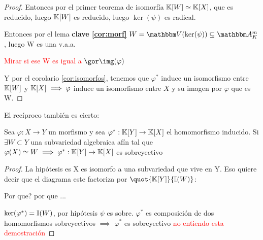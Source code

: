 \begin{proof}

Entonces por el primer teorema de isomorfía
$\mathbb{K}[W] \simeq \mathbb{K}[X]$, que es reducido, luego $\mathbb{K}[W]$ es reducido, luego $\ker(\psi)$ es radical.

Entonces por el lema \textbf{clave \ref{cor:morf}} $W=\V(\ker(\psi)) \subseteq \A_K^m$, luego W es una v.a.a.

\textcolor{red}{Mirar si ese W es igual a $\cls{\img(\varphi)}$}

Y por el corolario \ref{cor:isomorfos}, tenemos que $\varphi^*$ induce un isomorfismo entre $\mathbb{K}[W]$ y $\mathbb{K}[X] \implies \varphi$ induce un isomorfismo entre $X$ y su imagen por $\varphi$ que es W.

\end{proof}

El recíproco también es cierto:


\begin{lemma}
	Sea $\varphi: X \rightarrow Y$ un morfismo y sea $\varphi^*: \mathbb{K}[Y]\rightarrow \mathbb{K}[X]$ el homomorfismo inducido. Si $\exists W \subset Y$ una subvariedad algebraica afín tal que $\varphi(X) \simeq W \implies \varphi^*:\mathbb{K}[Y] \rightarrow \mathbb{K}[X]$ es sobreyectivo
\end{lemma}

\begin{proof}
	La hipótesis es X es isomorfo a una subvariedad que vive en Y. Eso quiere decir que el diagrama este factoriza por $\quot{\K[Y]}{\I(W)}$:


	Por que? por que ...

	$\ker(\varphi^*)=\mathbb{I}(W)$, por hipótesis $\psi$ es sobre. $\varphi^*$ es composición de dos homomorfismos sobreyectivos $\implies$ $\varphi^*$ es sobreyectivo \textcolor{red}{no entiendo esta demostración}

\end{proof}

